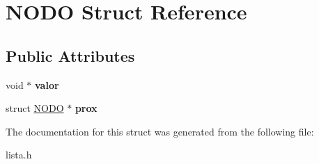 \hypertarget{struct_n_o_d_o}{}\section{N\+O\+DO Struct Reference}
\label{struct_n_o_d_o}
\subsection*{Public Attributes}
\begin{DoxyCompactItemize}
\item 
\mbox{\label{struct_n_o_d_o_a7295ec923d6d0ffeed534d397f49f535}} 
void $\ast$ {\bfseries valor}
\item 
\mbox{\label{struct_n_o_d_o_a78014339586cd5cc8579603c69d3e301}} 
struct \hyperlink{struct_n_o_d_o}{N\+O\+DO} $\ast$ {\bfseries prox}
\end{DoxyCompactItemize}


The documentation for this struct was generated from the following file\+:\begin{DoxyCompactItemize}
\item 
lista.\+h\end{DoxyCompactItemize}
